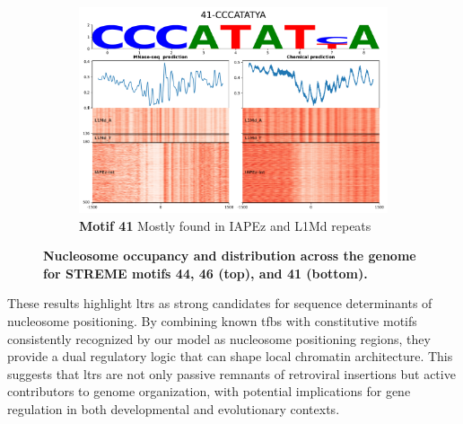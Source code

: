 \documentclass[11pt]{book}
\begin{document}
\begin{figure}[htbp]
    \begin{subfigure}{0.65\textwidth}
        \centering
        \includegraphics[width=\linewidth]{Figures/Results/xstreme_onrep_meta_hm/41-CCCATATYA.pdf}
        \caption{\textbf{Motif 41} Mostly found in IAPEz and L1Md repeats}
        \label{fig:xstreme41_ltr}
    \end{subfigure}

    \caption{\textbf{Nucleosome occupancy and distribution across the genome for STREME motifs 44, 46 (top), and 41 (bottom).}}
    \label{fig:xstreme_iapez_subfigs}
\end{figure}

These results highlight \glspl{ltr} as strong candidates for sequence determinants of nucleosome positioning. By combining known \gls{tfbs} with constitutive motifs consistently recognized by our model as nucleosome positioning regions, they provide a dual regulatory logic that can shape local chromatin architecture. This suggests that \glspl{ltr} are not only passive remnants of retroviral insertions but active contributors to genome organization, with potential implications for gene regulation in both developmental and evolutionary contexts.

\FloatBarrier
\clearpage
\end{document}
